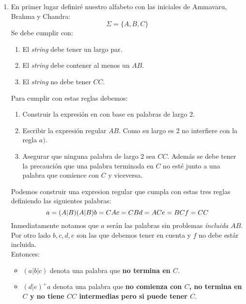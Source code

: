 \documentclass[spanish, fleqn]{article}
\begin{document}
\begin{enumerate}
		\item
			En primer lugar definiré nuestro alfabeto con las iniciales de 
			Ammavaru, Brahma y Chandra:
			\begin{equation*}
				\Sigma = \{A,B,C\}
			\end{equation*}
			Se debe cumplir con:
			\begin{enumerate}
				\item El \emph{string} debe tener un largo par.
				\item El \emph{string} debe contener al menos un \(AB\).
				\item El \emph{string} no debe tener \(CC\).
			\end{enumerate}
			Para cumplir con estas reglas debemos:
			\begin{enumerate}
				\item 
					Construir la expresión en con base en palabras de
					largo 2.
				\item
					Escribir la expresión regular \(AB\). Como su largo es 2 no
					interfiere con la regla \(a)\).
				\item
					Asegurar que ninguna palabra de largo 2 sea \(CC\). Además
					se debe tener la precaución que una palabra terminada en
					\(C\) no esté junto a una palabra que comience con \(C\) y
					viceversa.
			\end{enumerate}
			Podemos construir una expresion regular que cumpla con estas tres
			reglas definiendo las siguientes palabras:
			\begin{equation*}
				a = (A|B)(A|B) \\
				b = CA \\
				c = CB \\
				d = AC \\
				e = BC \\
				f = CC \\
			\end{equation*}
			Inmediatamente notamos que \(a\) serán las palabras sin problemas 
			\emph{incluida} \(AB\). Por otro lado \(b,c,d,e\) son las que
			debemos tener en cuenta y \(f\) no debe estár incluida.\\
			Entonces:
			\begin{itemize}
				\item
					\((a|b|c)\) denota una palabra que \textbf{no termina en
					\(C\)}.
				\item
					\((d|e)^+a\) denota una palabra que 
					\textbf{no comienza con \(C\), no termina en \(C\) y no 
					tiene \(CC\) intermedias pero si puede tener \(C\)}.

\end{itemize}
\end{enumerate}
\end{document}

